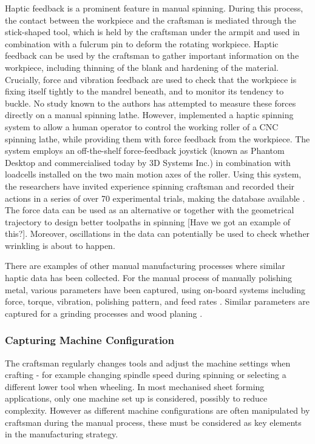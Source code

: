 Haptic feedback is a prominent feature in manual spinning. During this process, the contact between the workpiece and the craftsman is mediated through the stick-shaped tool, which is held by the craftsman under the armpit and used in combination with a fulcrum pin to deform the rotating workpiece. Haptic feedback can be used by the craftsman to gather important information on the workpiece, including thinning of the blank and hardening of the material. Crucially, force and vibration feedback are used to check that the workpiece is fixing itself tightly to the mandrel beneath, and to monitor its tendency to buckle.  No study known to the authors has attempted to measure these forces directly on a manual spinning lathe. However, \citep{RUSSO2019129} implemented a haptic spinning system to allow a human operator to control the working roller of a CNC spinning lathe, while providing them with force feedback from the workpiece. The system employs an off-the-shelf force-feedback joystick (known as Phantom Desktop and commercialised today by 3D Systems Inc.) in combination with loadcells installed on the two main motion axes of the roller. Using this system, the researchers have invited experience spinning craftsman and recorded their actions in a series of over 70 experimental trials, making the database available \citep{Russo2020}. The force data can be used as an alternative or together with the geometrical trajectory to design better toolpaths in spinning [Have we got an example of this?]. Moreover, oscillations in the data can potentially be used to check whether wrinkling is about to happen. 

There are examples of other manual manufacturing processes where similar haptic data has been collected. For the manual process of manually polishing metal, various parameters have been captured, using on-board systems including force, torque, vibration, polishing pattern, and feed rates \citep{kalt_monfared_jackson_2016}. Similar parameters are captured for a grinding processes \citep{Ng2014} and wood planing \citep{Montebelli2015}.


\subsubsection{Capturing Machine Configuration}
The craftsman regularly changes tools and adjust the machine settings when crafting - for example changing spindle speed during spinning or selecting a different lower tool when wheeling. In most mechanised sheet forming applications, only one machine set up is considered, possibly to reduce complexity. However as different machine configurations are often manipulated by craftsman during the manual process, these must be considered as key elements in the manufacturing strategy.

